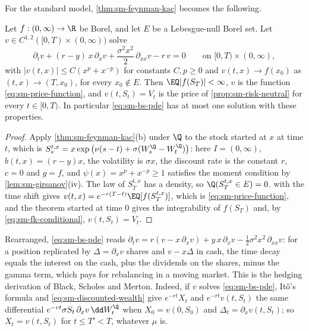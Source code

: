 For the standard model, \cref{thm:sm-feynman-kac} becomes the following.

\begin{corollary}\label{cor:sm-bs-pde}
Let $f:(0,\infty)\to\R$ be Borel, and let $E$ be a Lebesgue-null Borel set. Let $v\in C^{1,2}([0,T)\times(0,\infty))$ solve
\begin{equation}\label{eq:sm-bs-pde}
  \partial_tv+(r-y)\,x\,\partial_xv+\frac{\sigma^2x^2}{2}\,\partial_{xx}v-r\,v=0\qquad\text{on }[0,T)\times(0,\infty),
\end{equation}
with $|v(t,x)|\le C(x^p+x^{-p})$ for constants $C,p\ge0$ and $v(t,x)\to f(x_0)$ as
$(t,x)\to(T,x_0)$, for every $x_0\notin E$. Then $\EQ|f(S_T)|<\infty$, $v$ is the function
\eqref{eq:sm-price-function}, and $v(t,S_t)=V_t$ is the price of \cref{prop:sm-risk-neutral} for
every $t\in[0,T)$. In particular
\eqref{eq:sm-bs-pde} has at most one solution with these properties.
\end{corollary}

\begin{proof}
Apply \cref{thm:sm-feynman-kac}(b) under $\Q$ to the stock started at $x$ at time $t$, which is
$S^{t,x}_s=x\exp\big(\nu(s-t)+\sigma(W^\Q_s-W^\Q_t)\big)$: here $I=(0,\infty)$, $b(t,x)=(r-y)x$,
the volatility is $\sigma x$, the discount rate is the constant $r$, $c=0$ and $g=f$, and
$\psi(x)=x^p+x^{-p}\ge1$ satisfies the moment condition by \cref{lem:sm-girsanov}(iv). The law of $S^{t,x}_T$ has a density, so $\Q(S^{t,x}_T\in E)=0$.
 with the time shift gives $v(t,x)=e^{-r(T-t)}\EQ[f(S^{t,x}_T)]$, which is
\eqref{eq:sm-price-function}, and the theorem started at time $0$ gives the integrability of
$f(S_T)$ and, by \eqref{eq:sm-fk-conditional}, $v(t,S_t)=V_t$.
\end{proof}

\begin{remark}\label{rem:sm-hedge}
Rearranged, \eqref{eq:sm-bs-pde} reads
$\partial_tv=r(v-x\,\partial_xv)+y\,x\,\partial_xv-\frac12\sigma^2x^2\,\partial_{xx}v$: for a position
replicated by $\Delta=\partial_xv$ shares and $v-x\Delta$ in cash, the time decay equals the interest
on the cash, plus the dividends on the shares, minus the gamma term, which pays for rebalancing in
a moving market. This is the hedging derivation of Black, Scholes and Merton. Indeed, if $v$
solves \eqref{eq:sm-bs-pde}, It\^o's formula and \eqref{eq:sm-discounted-wealth} give
$e^{-rt}X_t$ and $e^{-rt}v(t,S_t)$ the same differential $e^{-rt}\sigma S_t\,\partial_xv\,\dd W^\Q_t$
when $X_0=v(0,S_0)$ and $\Delta_t=\partial_xv(t,S_t)$; so $X_t=v(t,S_t)$ for $t\le T'<T$, whatever $\mu$
is.
\end{remark}

